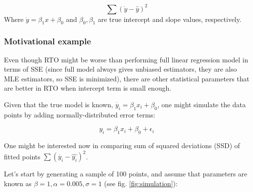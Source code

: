 \documentclass[12pt,a4paper,oneside]{book} %
\begin{document}
\[
	\sum (\dot{y}-\hat{y})^2
\]
Where $\dot{y}=\beta_1 x + \beta_0$ and $\beta_0, \beta_1$ are true intercept and slope values, respectively.

	\subsubsection{Motivational example}

Even though RTO might be worse than performing full linear regression model in terms of SSE (since full model always gives unbiased estimators, they are also MLE estimators, so SSE is minimized), there are other statistical parameters that are better in RTO when intercept term is small enough.

Given that the true model is known, $\dot{y_i} = \beta_1 x_i + \beta_0$, one might simulate the data points by adding normally-distributed error terms:

\[
	y_i =  \beta_1 x_i + \beta_0 + \epsilon_i
\]

One might be interested now in comparing sum of squared deviations (SSD) of fitted points $\sum (\dot{y_i}-\hat{y_i})^2 $.

Let's start by generating a sample of 100 points, and assume that parameters are known as $\beta = 1, \alpha = 0.005, \sigma=1$ (see fig. \ref{fig:simulation}):
\end{document}
